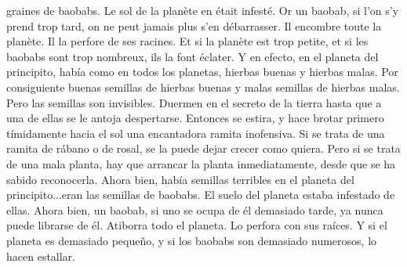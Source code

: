 \begin{paracol}[1]
{    graines de baobabs. Le sol de la planète en était infesté. Or
    un baobab, si l'on s'y prend trop tard, on ne peut jamais plus
    s'en débarrasser. Il encombre toute la planète. Il la perfore
    de ses racines. Et si la planète est trop petite, et si les
    baobabs sont trop nombreux, ils la font éclater.
}{\selectlanguage{\translang}
Y en efecto, en el planeta del principito, había como en todos
    los planetas, hierbas buenas y hierbas malas. Por consiguiente
    buenas semillas de hierbas buenas y malas semillas de hierbas
    malas. Pero las semillas son invisibles. Duermen en el secreto
    de la tierra hasta que a una de ellas se le antoja
    despertarse. Entonces se estira, y hace brotar primero
    tímidamente hacia el sol una encantadora ramita inofensiva. Si
    se trata de una ramita de rábano o de rosal, se la puede dejar
    crecer como quiera. Pero si se trata de una mala planta, hay
    que arrancar la planta inmediatamente, desde que se ha sabido
    reconocerla. Ahora bien, había semillas terribles en el
    planeta del principito...\allowbreak{}eran las semillas de
    baobabs. El suelo del planeta estaba infestado de ellas. Ahora
    bien, un baobab, si uno se ocupa de él demasiado tarde, ya
    nunca puede librarse de él. Atiborra todo el planeta. Lo
    perfora con sus raíces. Y si el planeta es demasiado pequeño,
    y si los baobabs son demasiado numerosos, lo hacen estallar.
}
\end{paracol}
